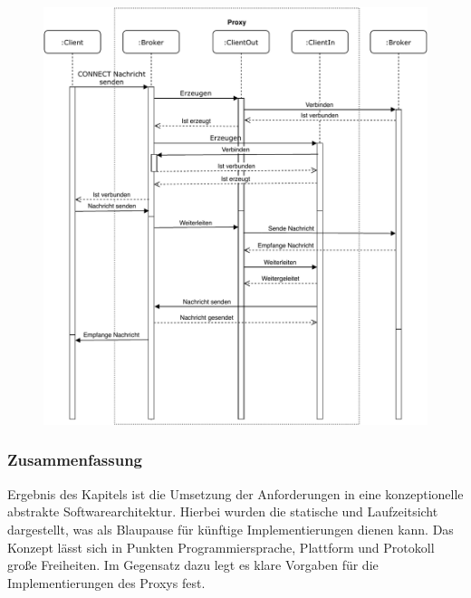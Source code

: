     \begin{figure}[!h]%
        \centering
        \includegraphics[width=14cm]{tex/bilder/4_konzept/Sequenz.pdf}
        \label{fig:sequenzdiagramm}
    \end{figure}

\subsubsection{Zusammenfassung}
    Ergebnis des Kapitels ist die Umsetzung der Anforderungen in eine konzeptionelle abstrakte Softwarearchitektur. Hierbei wurden die statische und Laufzeitsicht dargestellt, was als Blaupause für künftige Implementierungen dienen kann. Das Konzept lässt sich in Punkten Programmiersprache, Plattform und Protokoll große Freiheiten. Im Gegensatz dazu legt es klare Vorgaben für die Implementierungen des Proxys fest.